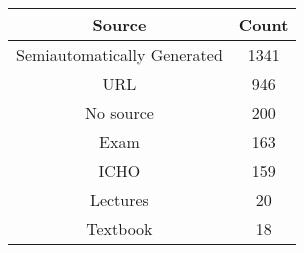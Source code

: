 \begin{tabular}{cc}
\toprule
Source & Count \\
\midrule
Semiautomatically Generated & 1341 \\
URL & 946 \\
No source & 200 \\
Exam & 163 \\
ICHO & 159 \\
Lectures & 20 \\
Textbook & 18 \\
\bottomrule
\end{tabular}

